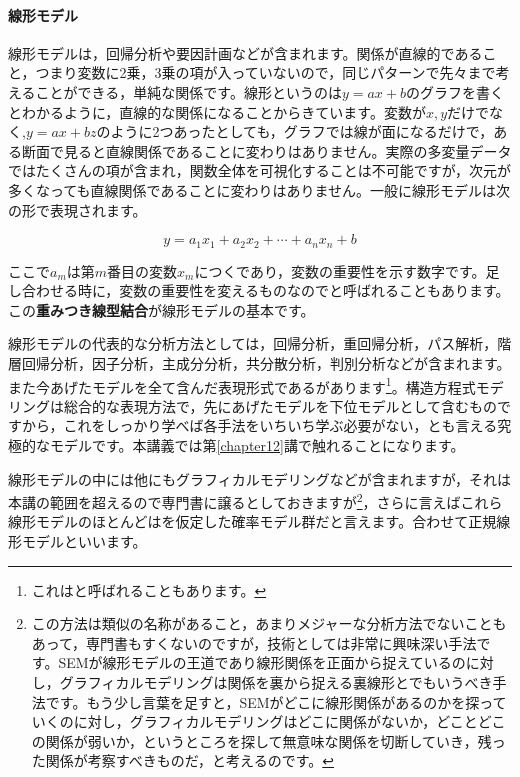 \documentclass{ltjsbook}
\begin{document}
\paragraph{線形モデル}線形モデルは，回帰分析や要因計画などが含まれます。関係が直線的であること，つまり変数に2乗，3乗の項が入っていないので，同じパターンで先々まで考えることができる，単純な関係です。線形というのは$y=ax+b$のグラフを書くとわかるように，直線的な関係になることからきています。変数が$x,y$だけでなく,$y = ax + bz$のように2つあったとしても，グラフでは線が面になるだけで，ある断面で見ると直線関係であることに変わりはありません。実際の多変量データではたくさんの項が含まれ，関数全体を可視化することは不可能ですが，次元が多くなっても直線関係であることに変わりはありません。一般に線形モデルは次の形で表現されます。

\[ y = a_1 x_1 + a_2 x_2 + \cdots + a_n x_n + b\]

ここで$a_m$は第$m$番目の変数$x_m$につくであり，変数の重要性を示す数字です。足し合わせる時に，変数の重要性を変えるものなのでと呼ばれることもあります。この\textbf{重みつき線型結合}が線形モデルの基本です。

線形モデルの代表的な分析方法としては，回帰分析，重回帰分析，パス解析，階層回帰分析，因子分析，主成分分析，共分散分析，判別分析などが含まれます。また今あげたモデルを全て含んだ表現形式であるがあります\footnote{これはと呼ばれることもあります。}。構造方程式モデリングは総合的な表現方法で，先にあげたモデルを下位モデルとして含むものですから，これをしっかり学べば各手法をいちいち学ぶ必要がない，とも言える究極的なモデルです。本講義では第\ref{chapter12}講で触れることになります。

線形モデルの中には他にもグラフィカルモデリング\citep{宮川1997}などが含まれますが，それは本講の範囲を超えるので専門書に譲るとしておきますが\footnote{この方法は類似の名称があること，あまりメジャーな分析方法でないこともあって，専門書もすくないのですが，技術としては非常に興味深い手法です。SEMが線形モデルの王道であり線形関係を正面から捉えているのに対し，グラフィカルモデリングは関係を裏から捉える裏線形とでもいうべき手法です。もう少し言葉を足すと，SEMがどこに線形関係があるのかを探っていくのに対し，グラフィカルモデリングはどこに関係がないか，どことどこの関係が弱いか，というところを探して無意味な関係を切断していき，残った関係が考察すべきものだ，と考えるのです。}，さらに言えばこれら線形モデルのほとんどはを仮定した確率モデル群だと言えます。合わせて正規線形モデルといいます。
\end{document}
